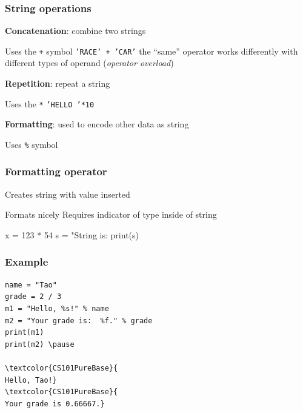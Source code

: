 \documentclass[11pt]{beamer}
\begin{document}
\begin{frame}
  \frametitle{String operations}
  \Enlarge

  \begin{itemize}
  \myitem  \textbf{Concatenation}:  combine two strings
    \begin{itemize}
    \mysubitem  Uses the \texttt{+} symbol
    \mysubitem  \texttt{'RACE' + 'CAR'} \pause
    \mysubitem the ``same'' operator works differently with different types of operand (\emph{operator overload})
    \end{itemize} \pause
  \myitem  \textbf{Repetition}:  repeat a string
    \begin{itemize}
    \mysubitem  Uses the \texttt{*}
    \mysubitem  \texttt{'HELLO '*10}
    \end{itemize} \pause
  \myitem  \textbf{Formatting}:  used to encode other data as string
    \begin{itemize}
    \mysubitem  Uses \texttt{\%} symbol
    \end{itemize}
  \end{itemize}
\end{frame}

\begin{frame}[fragile]
  \frametitle{Formatting operator}
  \Enlarge

  \begin{itemize}
  \myitem  Creates string with value inserted \pause
    \begin{itemize}
    \mysubitem  Formats nicely
    \mysubitem  Requires indicator of type inside of string
    \end{itemize} \pause
  \begin{semiverbatim}
x = 123 * 54
s = "String is: %
print(s)
  \end{semiverbatim}
  \end{itemize}
\end{frame}

\begin{frame}[fragile]
  \frametitle{Example}
  \Enlarge

  \begin{Verbatim}[commandchars=\\\{\}]
name = "Tao"
grade = 2 / 3
m1 = "Hello, %s!" % name
m2 = "Your grade is:  %f." % grade
print(m1)
print(m2) \pause

\textcolor{CS101PureBase}{
Hello, Tao!}
\textcolor{CS101PureBase}{
Your grade is 0.66667.}
  \end{Verbatim}
\end{frame}
\end{document}
